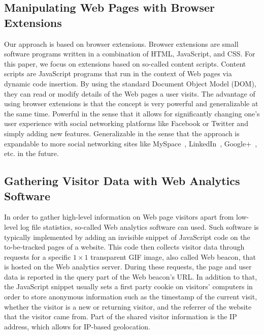 \documentclass{iosart2c}
\begin{document}
\subsection{Manipulating Web Pages with Browser Extensions}
Our approach is based on browser extensions.
Browser extensions are small software programs written in a combination of HTML, JavaScript, and CSS.
For this paper, we focus on extensions based on so-called content scripts.
Content scripts are JavaScript programs that run in the context of Web pages via dynamic code insertion.
By using the standard Document Object Model (DOM), they can read or modify details of the Web pages a user visits.
The advantage of using browser extensions is that the concept is very powerful and generalizable at the same time.
Powerful in the sense that it allows for significantly changing one's user experience with social networking platforms like Facebook or Twitter and simply adding new features.
Generalizable in the sense that the approach is expandable to more social networking sites like MySpace~\cite{MySpace}, LinkedIn~\cite{LinkedIn}, Google+~\cite{GooglePlus}, etc. in the future.

\subsection{Gathering Visitor Data with Web Analytics Software}
In order to gather high-level information on Web page visitors apart from low-level log file statistics, so-called Web analytics software can used.
Such software is typically implemented by adding an invisible snippet of JavaScript code on the to-be-tracked pages of a website.
This code then collects visitor data through requests for a specific $\mathit{1} \times \mathit{1}$ transparent GIF image, also called Web beacon, that is hosted on the Web analytics server.
During these requests, the page and user data is reported in the query part of the Web beacon's URL.
In addition to that, the JavaScript snippet usually sets a first party cookie on visitors' computers in order to store anonymous information such as the timestamp of the current visit, whether the visitor is a new or returning visitor, and the referrer of the website that the visitor came from.
Part of the shared visitor information is the IP address, which allows for IP-based geolocation.
\end{document}
